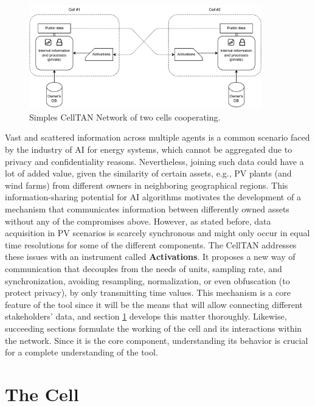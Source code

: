 \begin{figure}[h!]
    \centering
    \includegraphics[width=0.9\textwidth]{figures/chapter4/cell/intro.pdf}
    \caption{Simples CellTAN Network of two cells cooperating.}
    \label{fig:celltanintro}
\end{figure}

Vast and scattered information across multiple agents is a common scenario faced by the industry of AI for energy systems, which cannot be aggregated due to privacy and confidentiality reasons. Nevertheless, joining such data could have a lot of added value, given the similarity of certain assets, e.g., PV plants (and wind farms) from different owners in neighboring geographical regions. This information-sharing potential for AI algorithms motivates the development of a mechanism that communicates information between differently owned assets without any of the compromises above. However, as stated before, data acquisition in PV scenarios is scarcely synchronous and might only occur in equal time resolutions for some of the different components. The CellTAN addresses these issues with an instrument called \textbf{Activations}. It proposes a new way of communication that decouples from the needs of units, sampling rate, and synchronization, avoiding resampling, normalization, or even obfuscation (to protect privacy), by only transmitting time values. This mechanism is a core feature of the tool since it will be the means that will allow connecting different stakeholders' data, and section \ref{sec:thecell} develops this matter thoroughly. Likewise, succeeding sections formulate the working of the cell and its interactions within the network. Since it is the core component, understanding its behavior is crucial for a complete understanding of the tool.

\section{The Cell} \label{sec:thecell}

